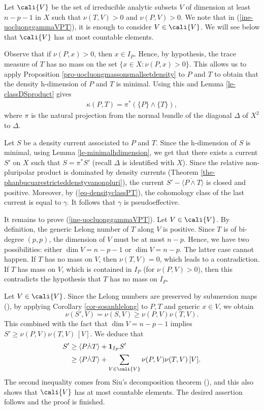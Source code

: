     \proof  
        Let $\cali{V}$ be the set of irreducible analytic subsets $V$ of dimension at least 
        $n-p-1$ in $X$ such that $\nu(T,V)>0$ and $\nu(P,V)>0$. We note that in (\ref{ine-uocluonggammaVPT}), it is enough to consider  $V \in \cali{V}$. We will see below that $\cali{V}$ has at most countable elements.     

        Observe that if $\nu(P,x)>0$, then $x \in I_P$. Hence, by hypothesis, the trace measure of $T$ has no mass on the set $\{x \in X: \nu(P,x)>0\}$. This allows us to apply Proposition \ref{pro-uocluongmassonsmallsetdensity} to $P$ and $T$ to obtain that the density h-dimension of $P$ and $T$ is minimal. Using this and Lemma \ref{le-classDSproduct} gives 
        \begin{align}\label{eq-densityclassPT}
            \kappa(P,T)= \pi^* (\{P\} \wedge \{T\}),
        \end{align}
        where $\pi$ is the natural projection from the normal bundle of the diagonal $\Delta$ of $X^2$ to $\Delta$.  

        Let $S$ be a density current associated to $P$ and $T$. Since the h-dimension of $S$ is minimal, using Lemma \ref{le-minimalhdimension}, we get that there exists a current $S'$ on $X$ such that $S= \pi^* S'$ (recall $\Delta$ is identified with $X$). Since the relative non-pluripolar product is dominated by density currents (Theorem \ref{the-phanbucuarestricteddenstyvanonpluri}), the current $S' - \langle P \dot{\wedge} T \rangle$ is closed and positive. Moreover, by (\ref{eq-densityclassPT}), the cohomology class of the last current is equal to $\gamma$. It follows that $\gamma$ is pseudoeffective. 

        It remains to prove (\ref{ine-uocluonggammaVPT}).  Let $V \in \cali{V}$. By definition, the generic Lelong number of $T$ along $V$ is positive. Since $T$ is of bi-degree $(p,p)$, the dimension of $V$ must be at most $n-p$. Hence, we have two possibilities: either $\dim V= n-p-1$ or $\dim V= n-p$. The latter case cannot happen. If $T$ has no mass on $V$, then $\nu(T,V)=0$, which leads to a contradiction. If $T$ has mass on $V$, which is contained in $I_P$ (for $\nu(P,V)>0$), then this contradicts the hypothesis that $T$ has no mass on $I_P$. 
  
        Let $V \in \cali{V}$. Since the Lelong numbers are preserved by submersion maps (\cite[Proposition 2.3]{Meo-auto-inter}), by applying Corollary \ref{cor-sosanhlelong} to $P,T$ and generic $x \in V$, we obtain 
        $$\nu(S',V)=\nu(S,V) \ge \nu(P,V) \nu(T,V).$$
        This combined with the fact that $\dim V= n-p-1$ implies  $S' \ge \nu(P,V) \nu(T,V) \, [V]$.
        We deduce that 
        \begin{align*}
            S' &\geq \langle P \dot{\wedge} T \rangle + \bold{1}_{I_P}S' \\
            &\geq  \langle P \dot{\wedge} T \rangle + \sum_{V \in\cali{V}}\nu(P,V) \nu(T,V) \, [V].
        \end{align*}
        The second inequality comes from Siu's decomposition theorem (\cite[2.18]{Demailly_analyticmethod}), and this also shows that $\cali{V}$ has at most countable elements. The desired assertion follows and the proof is finished.
    \endproof


